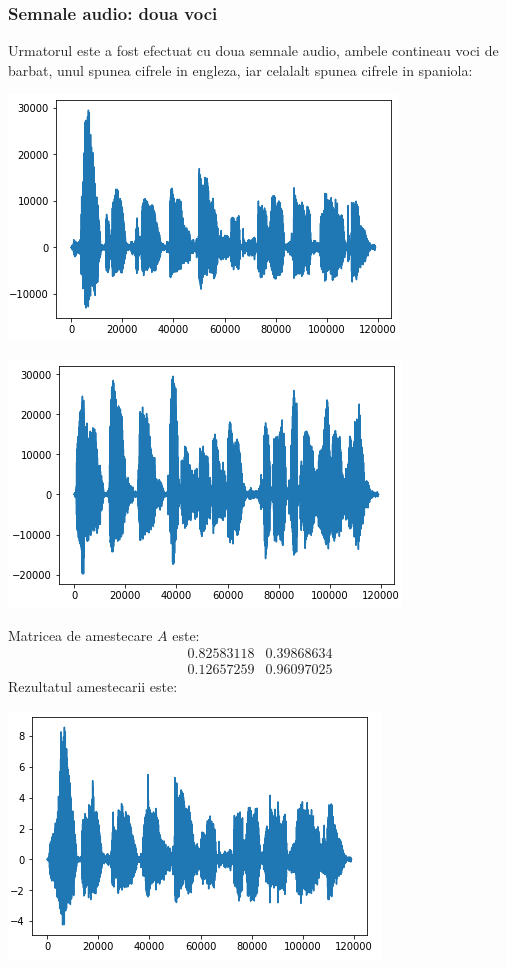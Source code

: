 \documentclass[12pt,oneside]{article}
\begin{document}
 \subsubsection{Semnale audio: doua voci}
 Urmatorul este a fost efectuat cu doua semnale audio, ambele contineau voci de barbat, unul spunea cifrele in engleza, iar celalalt spunea cifrele in spaniola:
 \begin{center}
	\includegraphics[scale=1]{english_speech}
 \end{center}
\begin{center}
	\includegraphics[scale=1]{spanish_speech}
\end{center}
 
 Matricea de amestecare $A$ este: 
\[
 \begin{matrix}
	0.82583118 & 0.39868634 \\
	0.12657259 & 0.96097025
 \end{matrix}
\]
Rezultatul amestecarii este:
\begin{center}
	\includegraphics[scale=1]{speech_mixed_1}
 \end{center}
\end{document}
